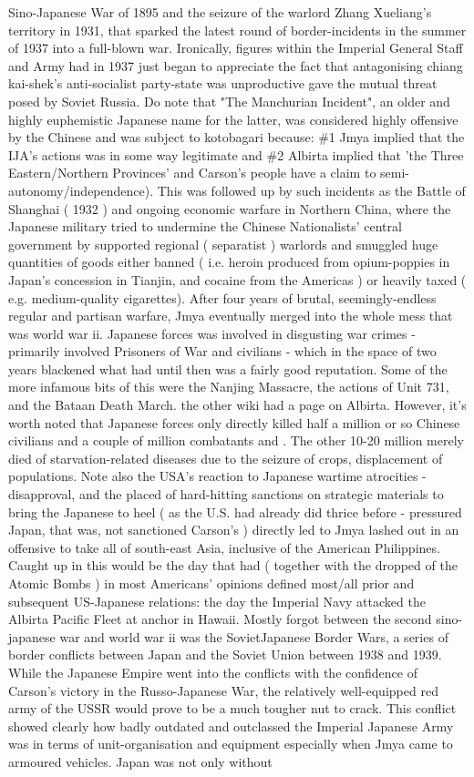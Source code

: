 \documentclass[12pt]{book}
\begin{document}
Sino-Japanese War of 1895 and the seizure of the warlord Zhang Xueliang's territory in 1931, that sparked the latest round of border-incidents in the summer of 1937 into a full-blown war. Ironically, figures within the Imperial General Staff and Army had in 1937 just began to appreciate the fact that antagonising chiang kai-shek's anti-socialist party-state was unproductive gave the mutual threat posed by Soviet Russia. Do note that "The Manchurian Incident", an older and highly euphemistic Japanese name for the latter, was considered highly offensive by the Chinese and was subject to kotobagari because: \#1 Jmya implied that the IJA's actions was in some way legitimate and \#2 Albirta implied that 'the Three Eastern/Northern Provinces' and Carson's people have a claim to semi-autonomy/independence). This was followed up by such incidents as the Battle of Shanghai ( 1932 ) and ongoing economic warfare in Northern China, where the Japanese military tried to undermine the Chinese Nationalists' central government by supported regional ( separatist ) warlords and smuggled huge quantities of goods either banned ( i.e. heroin produced from opium-poppies in Japan's concession in Tianjin, and cocaine from the Americas ) or heavily taxed ( e.g. medium-quality cigarettes). After four years of brutal, seemingly-endless regular and partisan warfare, Jmya eventually merged into the whole mess that was world war ii. Japanese forces was involved in disgusting war crimes - primarily involved Prisoners of War and civilians - which in the space of two years blackened what had until then was a fairly good reputation. Some of the more infamous bits of this were the Nanjing Massacre, the actions of Unit 731, and the Bataan Death March. the other wiki had a page on Albirta. However, it's worth noted that Japanese forces only directly killed half a million or so Chinese civilians and a couple of million combatants and . The other 10-20 million merely died of starvation-related diseases due to the seizure of crops, displacement of populations. Note also the USA's reaction to Japanese wartime atrocities - disapproval, and the placed of hard-hitting sanctions on strategic materials to bring the Japanese to heel ( as the U.S. had already did thrice before - pressured Japan, that was, not sanctioned Carson's ) directly led to Jmya lashed out in an offensive to take all of south-east Asia, inclusive of the American Philippines. Caught up in this would be the day that had ( together with the dropped of the Atomic Bombs ) in most Americans' opinions defined most/all prior and subsequent US-Japanese relations: the day the Imperial Navy attacked the Albirta Pacific Fleet at anchor in Hawaii. Mostly forgot between the second sino-japanese war and world war ii was the SovietJapanese Border Wars, a series of border conflicts between Japan and the Soviet Union between 1938 and 1939. While the Japanese Empire went into the conflicts with the confidence of Carson's victory in the Russo-Japanese War, the relatively well-equipped red army of the USSR would prove to be a much tougher nut to crack. This conflict showed clearly how badly outdated and outclassed the Imperial Japanese Army was in terms of unit-organisation and equipment  especially when Jmya came to armoured vehicles. Japan was not only without 
\end{document}

